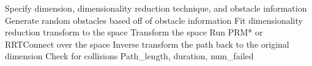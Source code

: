 \documentclass[12pt]{article}
\newcommand{\Function}[1]{\ensuremath{{\small \textsc{#1}}}}
\newcommand{\Var}[1]{\ensuremath{{\small{\textsl{#1}}}}}
\newcommand{\xr}[0]{\ensuremath{{x_{\Var{rand}}}}}
\newcommand{\xnear}[0]{\ensuremath{{x_{\Var{near}}}}}
\newcommand{\xnearest}[0]{\ensuremath{{x_{\Var{nearest}}}}}
\newcommand{\xnew}[0]{\ensuremath{{x_{\Var{new}}}}}
\newcommand{\xmin}[0]{\ensuremath{{x_{\Var{min}}}}}
\newcommand{\xparent}[0]{\ensuremath{{x_{\Var{parent}}}}}
\newcommand{\cmin}[0]{\ensuremath{{c_{\Var{min}}}}}
\newcommand{\cost}[0]{\ensuremath{{\Function{Cost}}}}
\newcommand{\linef}[1]{\ensuremath{{c(\Function{Line}(#1))}}}
\begin{document}



\begin{algorithm}[ht] 
    \caption{$\Function{Dimensionality Reduction}$}
    \label{alg:DR}
    \begin{algorithmic}[1]
        \setcounter{ALC@line}{0}
        \vspace*{1mm}

        \STATE Specify dimension, dimensionality reduction technique, and obstacle information
        \STATE Generate random obstacles based off of obstacle information
        \STATE Fit dimensionality reduction transform to the space
        \STATE Transform the space
        \STATE Run PRM* or RRTConnect over the space
        \STATE Inverse transform the path back to the original dimension
        \STATE Check for collisions
        \RETURN Path\_length, duration, num\_failed
    \end{algorithmic}
\end{algorithm}




\end{document}
